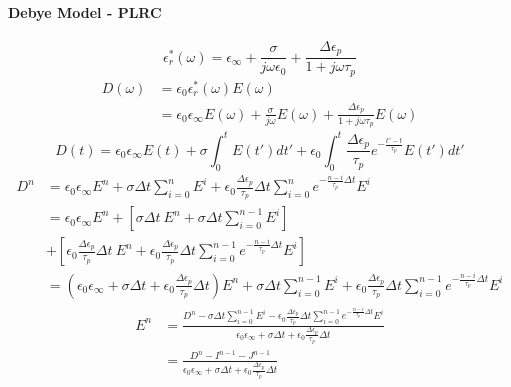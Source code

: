 \paragraph{{\msjh Debye Model - PLRC}}
\begin{displaymath}
  \epsilon_r^*(\omega) = \epsilon_{\infty} + \frac{\sigma}{j\omega \epsilon_0} + \frac{\Delta \epsilon_p}{1+j\omega \tau_p}
\end{displaymath}
\begin{displaymath}
  \begin{split}
    D(\omega) & = \epsilon_0 \epsilon_r^*(\omega) E(\omega)\\
    & = \epsilon_0 \epsilon_{\infty} E(\omega) + \frac{\sigma}{j\omega} E(\omega) + \frac{\Delta \epsilon_p}{1+j\omega \tau_p}E(\omega)
  \end{split}
\end{displaymath}
\begin{displaymath}
  D(t) = \epsilon_0 \epsilon_{\infty} E(t) + \sigma \int_0^t E(t')dt' + \epsilon_0 \int_0^t \frac{\Delta \epsilon_p}{\tau_p}e^{-\frac{t'-t}{\tau_p}}E(t')dt'
\end{displaymath}
\begin{displaymath}
  \begin{split}
    D^n & = \epsilon_0 \epsilon_{\infty}E^n + \sigma \Delta t \sum_{i=0}^{n}E^i + \epsilon_0 \frac{\Delta \epsilon_p}{\tau_p}\Delta t \sum_{i=0}^{n} e^{-\frac{n-i}{\tau_p}\Delta t} E^i\\
    & = \epsilon_0 \epsilon_{\infty} E^n + \left[\sigma \Delta t\ E^n + \sigma \Delta t \sum_{i=0}^{n-1}E^i\right]\\
    & + \left[\epsilon_0 \frac{\Delta \epsilon_p}{\tau_p}\Delta t\ E^n + \epsilon_0 \frac{\Delta \epsilon_p}{\tau_p} \Delta t \sum_{i=0}^{n-1}e^{-\frac{n-i}{\tau_p}\Delta t}E^i\right]\\
    & = \left(\epsilon_0 \epsilon_{\infty} + \sigma \Delta t + \epsilon_0 \frac{\Delta \epsilon_p}{\tau_p} \Delta t\right)E^n + \sigma \Delta t \sum_{i=0}^{n-1}E^i + \epsilon_0 \frac{\Delta \epsilon_p}{\tau_p}\Delta t \sum_{i=0}^{n-1}e^{-\frac{n-i}{\tau_p}\Delta t}E^i
  \end{split}
\end{displaymath}
\begin{displaymath}
  \begin{split}
    E^n & = \frac{\displaystyle D^n - \sigma \Delta t \sum_{i=0}^{n-1}E^i - \epsilon_0 \frac{\Delta \epsilon_p}{\tau_p}\Delta t \sum_{i=0}^{n-1}e^{-\frac{n-i}{\tau_p}\Delta t}E^i }{\displaystyle\epsilon_0 \epsilon_{\infty} + \sigma \Delta t + \epsilon_0 \frac{\Delta \epsilon_p}{\tau_p} \Delta t}\\
    & = \frac{\displaystyle D^n - I^{n-1} - J^{n-1} }{\displaystyle\epsilon_0 \epsilon_{\infty} + \sigma \Delta t + \epsilon_0 \frac{\Delta \epsilon_p}{\tau_p} \Delta t}\\
  \end{split}
\end{displaymath}





